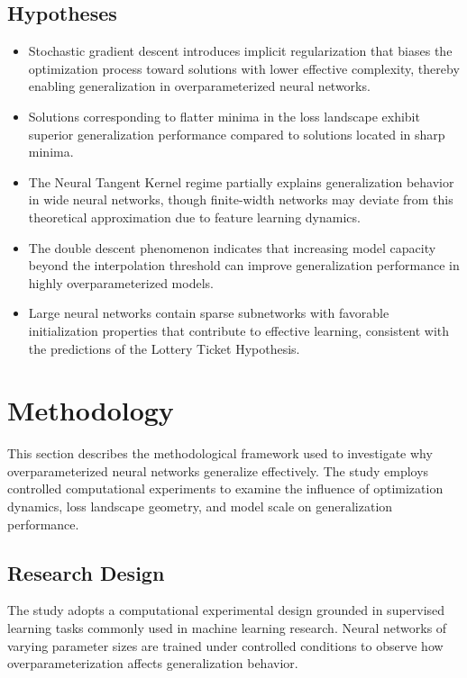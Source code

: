 \documentclass[conference]{IEEEtran}
\begin{document}
\subsection{Hypotheses}

\begin{itemize}
    \item[\textbf{H1.}] Stochastic gradient descent introduces implicit regularization that biases the optimization process toward solutions with lower effective complexity, thereby enabling generalization in overparameterized neural networks.
    \item[\textbf{H2.}] Solutions corresponding to flatter minima in the loss landscape exhibit superior generalization performance compared to solutions located in sharp minima.
    \item[\textbf{H3.}] The Neural Tangent Kernel regime partially explains generalization behavior in wide neural networks, though finite-width networks may deviate from this theoretical approximation due to feature learning dynamics.
    \item[\textbf{H4.}] The double descent phenomenon indicates that increasing model capacity beyond the interpolation threshold can improve generalization performance in highly overparameterized models.
    \item[\textbf{H5.}] Large neural networks contain sparse subnetworks with favorable initialization properties that contribute to effective learning, consistent with the predictions of the Lottery Ticket Hypothesis.
\end{itemize}

\section{Methodology}

This section describes the methodological framework used to investigate why overparameterized neural networks generalize effectively. The study employs controlled computational experiments to examine the influence of optimization dynamics, loss landscape geometry, and model scale on generalization performance.

\subsection{Research Design}

The study adopts a computational experimental design grounded in supervised learning tasks commonly used in machine learning research. Neural networks of varying parameter sizes are trained under controlled conditions to observe how overparameterization affects generalization behavior.
\end{document}
